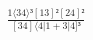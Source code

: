 \documentclass[varwidth, border=5pt]{standalone}
\begin{document}
\begin{my}
$\begin{gathered}
\scriptscriptstyle\frac{1⟨34⟩³[13]²[24]²}{[34]⟨4|1+3|4]³}
\end{gathered}$
\end{my}
\end{document}
